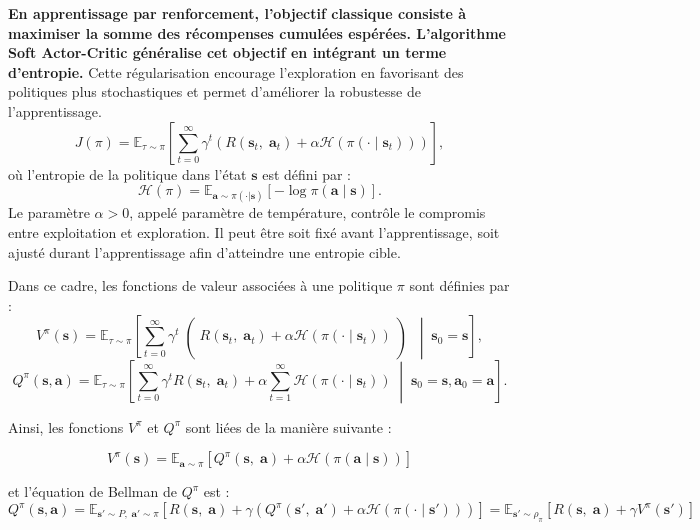 \vspace{10pt}

\noindent \textbf{En apprentissage par renforcement, l'objectif classique consiste à maximiser la somme des récompenses cumulées espérées. L'algorithme Soft Actor-Critic généralise cet objectif en intégrant un terme d'entropie.} Cette régularisation encourage l'exploration en favorisant des politiques plus stochastiques et permet d'améliorer la robustesse de l'apprentissage.
$$
    J(\pi) = \mathbb{E}_{\tau \sim \pi}
    \left[ \sum _{t=0}^\infty \gamma^t (R(\mathbf{s}_t, \; \mathbf{a}_t) + \alpha \mathcal{H}(\pi(\cdot \mid \mathbf{s}_t))) \right],
$$
où l'entropie de la politique dans l'état $\mathbf{s}$ est défini par :
$$
    \mathcal{H}(\pi) = \mathbb{E}_{\mathbf{a} \sim \pi(\cdot|\mathbf{s})}\left[-\log \pi(\mathbf{a} \mid \mathbf{s})\right].
$$
\noindent Le paramètre $\alpha > 0$, appelé paramètre de température, contrôle le compromis entre exploitation et exploration. Il peut être soit fixé avant l'apprentissage, soit ajusté durant l'apprentissage afin d'atteindre une entropie cible.

\vspace{10pt}

\noindent Dans ce cadre, les fonctions de valeur associées à une politique $\pi$ sont définies par :
$$
    V^\pi(\mathbf{s}) = \mathbb{E}_{\tau \sim \pi}
    \left[
        \sum _{t=0}^\infty \gamma^t \middle(R(\mathbf{s}_t, \; \mathbf{a}_t) + \alpha \mathcal{H}(\pi(\cdot \mid \mathbf{s}_t))\middle)
        \; \middle| \;
        \mathbf{s}_0 = \mathbf{s}
        \right],
$$
$$
    Q^\pi(\mathbf{s}, \mathbf{a}) = \mathbb{E}_{\tau \sim \pi}
    \left[
        \sum _{t=0}^\infty \gamma^t R(\mathbf{s}_t, \; \mathbf{a}_t) + \alpha \sum _{t=1}^\infty\mathcal{H}(\pi(\cdot \mid \mathbf{s}_t))
        \; \middle| \;
        \mathbf{s}_0 = \mathbf{s}, \mathbf{a}_0 = \mathbf{a}
        \right].
$$

\noindent Ainsi, les fonctions $V^\pi$ et $Q^\pi$ sont liées de la manière suivante :

$$
    V^\pi(\mathbf{s}) = \mathbb{E}_{\mathbf{a} \sim \pi} [Q^\pi(\mathbf{s}, \; \mathbf{a}) + \alpha \mathcal{H}(\pi(\mathbf{a} \mid \mathbf{s}))]
$$

\noindent et l'équation de Bellman  de $Q^\pi$ est :
$$
    Q^\pi(\mathbf{s}, \mathbf{a})
    = \mathbb{E}_{\mathbf{s}'\sim P, \; \mathbf{a}' \sim \pi}
    [
        R(\mathbf{s}, \; \mathbf{a}) + \gamma (Q^\pi(\mathbf{s}', \; \mathbf{a}') + \alpha \mathcal{H}(\pi(\cdot \mid \mathbf{s}')))
    ]
    = \mathbb{E}_{\mathbf{s}' \sim \rho_\pi} [R(\mathbf{s}, \; \mathbf{a}) + \gamma V^\pi(\mathbf{s}')]
$$


